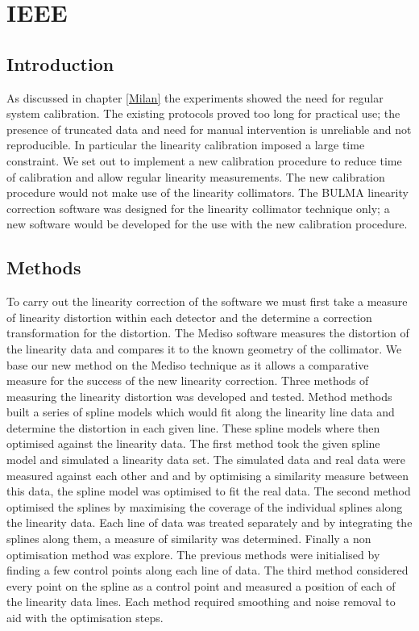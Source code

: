 \chapter{IEEE}
\label{IEEE}

\section{Introduction}
As discussed in chapter \ref{Milan} the experiments showed the need for regular system calibration. The existing protocols proved too long for practical use; the presence of truncated data and need for manual intervention is unreliable and not reproducible. In particular the linearity calibration imposed a large time constraint. We set out to implement a new calibration procedure to reduce time of calibration and allow regular linearity measurements. The new calibration procedure would not make use of the linearity collimators. The BULMA linearity correction software was designed for the linearity collimator technique only; a new software would be developed for the use with the new calibration procedure. 
\section{Methods}
To carry out the linearity correction of the software we must first take a measure of linearity distortion within each detector and the determine a correction transformation for the distortion. The Mediso software measures the distortion of the linearity data and compares it to the known geometry of the collimator. We base our new method on the Mediso technique as it allows a comparative measure for the success of the new linearity correction. Three methods of measuring the linearity distortion was developed and tested. Method methods built a series of spline models which would fit along the linearity line data and determine the distortion in each given line. These spline models where then optimised against the linearity data. The first method took the given spline model and simulated a linearity data set. The simulated data and real data were measured against each other and and by optimising a similarity measure between this data, the spline model was optimised to fit the real data.
The second method optimised the splines by maximising the coverage of the individual splines along the linearity data. Each line of data was treated separately and by integrating the splines along them, a measure of similarity was determined. 
Finally a non optimisation method was explore. The previous methods were initialised by finding a few control points along each line of data. The third method considered every point on the spline as a control point and measured a position of each of the linearity data lines. 
Each method required smoothing and noise removal to aid with the optimisation steps. 
